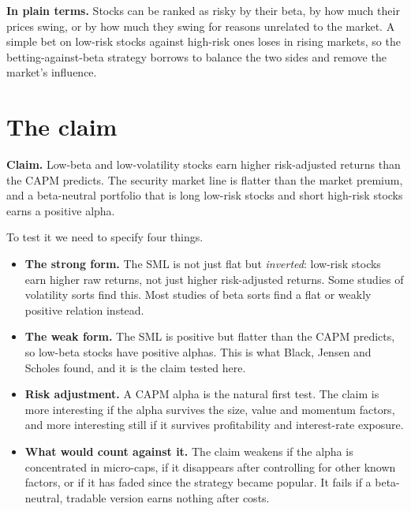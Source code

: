 \noindent\textbf{In plain terms.} Stocks can be ranked as risky by their beta, by how much their prices swing, or by how much they swing for reasons unrelated to the market. A simple bet on low-risk stocks against high-risk ones loses in rising markets, so the betting-against-beta strategy borrows to balance the two sides and remove the market's influence.

\section{The claim}
\label{sec:18-claim}

\begin{callout}
\textbf{Claim.} Low-beta and low-volatility stocks earn higher risk-adjusted returns than the CAPM predicts. The security market line is flatter than the market premium, and a beta-neutral portfolio that is long low-risk stocks and short high-risk stocks earns a positive alpha.
\end{callout}

To test it we need to specify four things.

\begin{itemize}
  \item \textbf{The strong form.} The SML is not just flat but \emph{inverted}: low-risk stocks earn higher raw returns, not just higher risk-adjusted returns. Some studies of volatility sorts find this. Most studies of beta sorts find a flat or weakly positive relation instead.
  \item \textbf{The weak form.} The SML is positive but flatter than the CAPM predicts, so low-beta stocks have positive alphas. This is what Black, Jensen and Scholes found, and it is the claim tested here.
  \item \textbf{Risk adjustment.} A CAPM alpha is the natural first test. The claim is more interesting if the alpha survives the size, value and momentum factors, and more interesting still if it survives profitability and interest-rate exposure.
  \item \textbf{What would count against it.} The claim weakens if the alpha is concentrated in micro-caps, if it disappears after controlling for other known factors, or if it has faded since the strategy became popular. It fails if a beta-neutral, tradable version earns nothing after costs.
\end{itemize}


